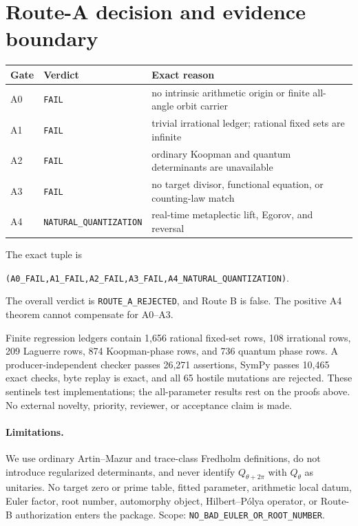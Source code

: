 \documentclass[10pt]{article}
\begin{document}
\section{Route-A decision and evidence boundary}
\begin{center}
\small
\begin{tabular}{lll}
\toprule
Gate&Verdict&Exact reason\\
\midrule
A0&\texttt{FAIL}&no intrinsic arithmetic origin or finite all-angle orbit carrier\\
A1&\texttt{FAIL}&trivial irrational ledger; rational fixed sets are infinite\\
A2&\texttt{FAIL}&ordinary Koopman and quantum determinants are unavailable\\
A3&\texttt{FAIL}&no target divisor, functional equation, or counting-law match\\
A4&\texttt{NATURAL\_QUANTIZATION}&real-time metaplectic lift, Egorov, and reversal\\
\bottomrule
\end{tabular}
\end{center}
The exact tuple is
\begin{center}
\small\texttt{(A0\_FAIL,A1\_FAIL,A2\_FAIL,A3\_FAIL,A4\_NATURAL\_QUANTIZATION)}.
\end{center}
The overall verdict is \texttt{ROUTE\_A\_REJECTED}, and Route B is false.
The positive A4 theorem cannot compensate for A0--A3.

Finite regression ledgers contain 1{,}656 rational fixed-set rows, 108
irrational rows, 209 Laguerre rows, 874 Koopman-phase rows, and 736 quantum
phase rows.  A producer-independent checker passes 26{,}271 assertions,
SymPy passes 10{,}465 exact checks, byte replay is exact, and all 65 hostile
mutations are rejected.  These sentinels test implementations; the
all-parameter results rest on the proofs above.  No external novelty,
priority, reviewer, or acceptance claim is made.

\paragraph{Limitations.}
We use ordinary Artin--Mazur and trace-class Fredholm definitions, do not
introduce regularized determinants, and never identify $Q_{\theta+2\pi}$
with $Q_\theta$ as unitaries.  No target zero or prime table, fitted
parameter, arithmetic local datum, Euler factor, root number, automorphy
object, Hilbert--P\'olya operator, or Route-B authorization enters the
package.  Scope: \texttt{NO\_BAD\_EULER\_OR\_ROOT\_NUMBER}.
\end{document}
